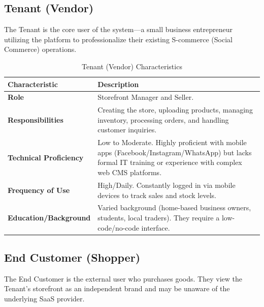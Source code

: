 \subsection*{Tenant (Vendor)}
\label{subsec:tenant}
The Tenant is the core user of the system—a small business entrepreneur utilizing the platform to professionalize their existing S-commerce (Social Commerce) operations.

\begin{table}[H]
\centering
\begin{tabular}{|p{4.5cm}|p{10cm}|}
\hline
\textbf{Characteristic} & \textbf{Description} \\
\hline
\textbf{Role} & Storefront Manager and Seller. \\
\hline
\textbf{Responsibilities} & Creating the store, uploading products, managing inventory, processing orders, and handling customer inquiries. \\
\hline
\textbf{Technical Proficiency} & Low to Moderate. Highly proficient with mobile apps (Facebook/Instagram/WhatsApp) but lacks formal IT training or experience with complex web CMS platforms. \\
\hline
\textbf{Frequency of Use} & High/Daily. Constantly logged in via mobile devices to track sales and stock levels. \\
\hline
\textbf{Education/Background} & Varied background (home-based business owners, students, local traders). They require a low-code/no-code interface. \\
\hline
\end{tabular}
\caption{Tenant (Vendor) Characteristics}
\label{tab:tenant}
\end{table}

\subsection*{End Customer (Shopper)}
\label{subsec:end-customer}
The End Customer is the external user who purchases goods. They view the Tenant’s storefront as an independent brand and may be unaware of the underlying SaaS provider.

